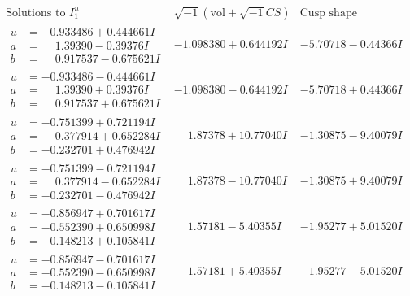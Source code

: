 \documentclass[1p]{elsarticle_modified}
\theoremstyle{definition}
\newcommand{\I}{\sqrt{-1}}
\begin{document}
$$\begin{array}{c|c|c}  
\text{Solutions to }I^u_{1}& \I (\text{vol} + \sqrt{-1}CS) & \text{Cusp shape}\\
 \hline 
\begin{aligned}
u &= -0.933486 + 0.444661 I \\
a &= \phantom{-}1.39390 - 0.39376 I \\
b &= \phantom{-}0.917537 - 0.675621 I\end{aligned}
 & -1.098380 + 0.644192 I & -5.70718 - 0.44366 I \\ \hline\begin{aligned}
u &= -0.933486 - 0.444661 I \\
a &= \phantom{-}1.39390 + 0.39376 I \\
b &= \phantom{-}0.917537 + 0.675621 I\end{aligned}
 & -1.098380 - 0.644192 I & -5.70718 + 0.44366 I \\ \hline\begin{aligned}
u &= -0.751399 + 0.721194 I \\
a &= \phantom{-}0.377914 + 0.652284 I \\
b &= -0.232701 + 0.476942 I\end{aligned}
 & \phantom{-}1.87378 + 10.77040 I & -1.30875 - 9.40079 I \\ \hline\begin{aligned}
u &= -0.751399 - 0.721194 I \\
a &= \phantom{-}0.377914 - 0.652284 I \\
b &= -0.232701 - 0.476942 I\end{aligned}
 & \phantom{-}1.87378 - 10.77040 I & -1.30875 + 9.40079 I \\ \hline\begin{aligned}
u &= -0.856947 + 0.701617 I \\
a &= -0.552390 + 0.650998 I \\
b &= -0.148213 + 0.105841 I\end{aligned}
 & \phantom{-}1.57181 - 5.40355 I & -1.95277 + 5.01520 I \\ \hline\begin{aligned}
u &= -0.856947 - 0.701617 I \\
a &= -0.552390 - 0.650998 I \\
b &= -0.148213 - 0.105841 I\end{aligned}
 & \phantom{-}1.57181 + 5.40355 I & -1.95277 - 5.01520 I \\ \hline\begin{aligned}

\end{aligned}
\end{array}$$
\end{document}
